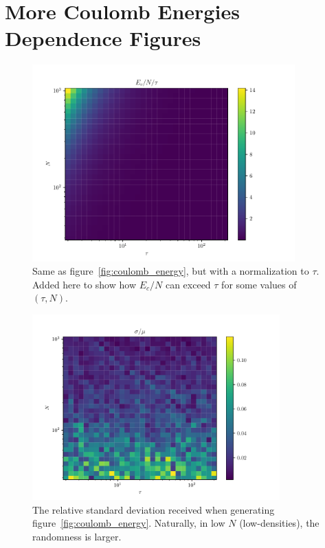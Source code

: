 \chapter{More Coulomb Energies Dependence Figures}\label{chap:coulomb}

\begin{figure}[h]
	\begin{center}
		\includegraphics[width=0.9\textwidth]{graphics/coulomb_energy_example@relative_coulomb_energy.pdf}
	\end{center}
	\caption{Same as figure~\ref{fig:coulomb_energy}, but with a normalization to $\tau$. Added here to show how $E_c/N$ can exceed $\tau$ for some values of $(\tau,N)$.}
	\label{fig:coulomb_energy_normalized}
\end{figure}

\begin{figure}
	\begin{center}
		\includegraphics[width=0.85\textwidth]{graphics/coulomb_energy_example@relative_std.pdf}
	\end{center}
	\caption{The relative standard deviation received when generating figure~\ref{fig:coulomb_energy}. Naturally, in low $N$ (low-densities), the randomness is larger.}
	\label{fig:coulomb_energy_std}
\end{figure}


